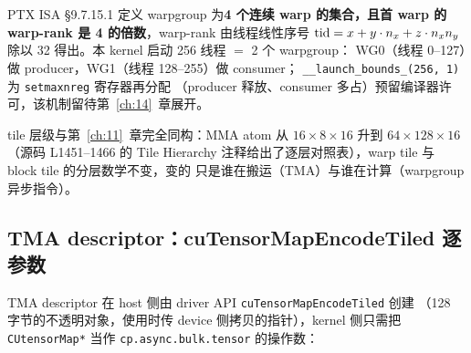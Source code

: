 PTX ISA §9.7.15.1 定义 warpgroup 为\textbf{4 个连续 warp 的集合，且首 warp 的 warp-rank
是 4 的倍数}，warp-rank 由线程线性序号 $\mathrm{tid} = x + y \cdot n\sb{x} +
z \cdot n\sb{x} n\sb{y}$ 除以 32 得出。本 kernel 启动 256 线程 $=$ 2 个 warpgroup：
WG0（线程 0--127）做 producer，WG1（线程 128--255）做 consumer；
\texttt{\_\allowbreak{}\_\allowbreak{}launch\_\allowbreak{}bounds\_\allowbreak{}(256,\allowbreak{} 1)} 为 \texttt{setmaxnreg} 寄存器再分配
（producer 释放、consumer 多占）预留编译器许可，该机制留待第~\ref{ch:14}~章展开。



tile 层级与第~\ref{ch:11}~章完全同构：MMA atom 从
$16 \times 8 \times 16$ 升到 $64 \times 128 \times 16$（源码 L1451--1466 的 Tile
Hierarchy 注释给出了逐层对照表），warp tile 与 block tile 的分层数学不变，变的
只是谁在搬运（TMA）与谁在计算（warpgroup 异步指令）。

\subsection{TMA descriptor：cuTensorMapEncodeTiled 逐参数}

TMA descriptor 在 host 侧由 driver API \texttt{cu\allowbreak{}Tensor\allowbreak{}Map\allowbreak{}Encode\allowbreak{}Tiled} 创建
（128 字节的不透明对象，使用时传 device 侧拷贝的指针），kernel 侧只需把
\texttt{CUtensor\allowbreak{}Map*} 当作 \texttt{cp.\allowbreak{}async.\allowbreak{}bulk.\allowbreak{}tensor} 的操作数：



